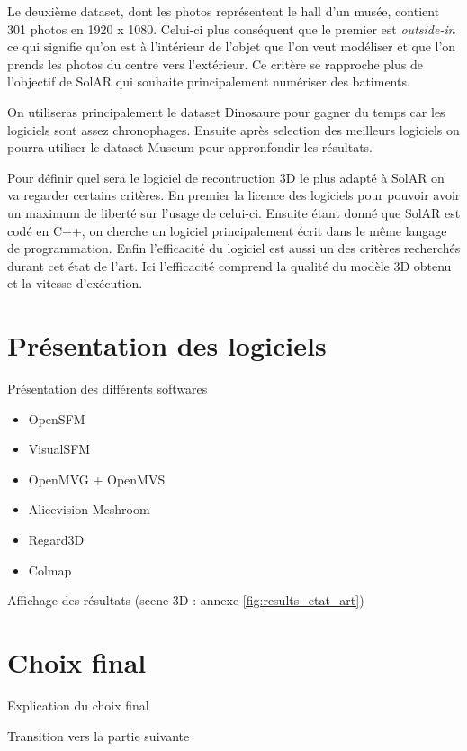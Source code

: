 Le deuxième dataset, dont les photos représentent le hall d'un musée, contient 301 photos en 1920 x 1080. Celui-ci plus conséquent que le premier est \emph{outside-in} ce qui signifie qu'on est à l'intérieur de l'objet que l'on veut modéliser et que l'on prends les photos du centre vers l'extérieur. Ce critère se rapproche plus de l'objectif de SolAR qui souhaite principalement numériser des batiments. 

On utiliseras principalement le dataset Dinosaure pour gagner du temps car les logiciels sont assez chronophages. Ensuite après selection des meilleurs logiciels on pourra utiliser le dataset Museum pour appronfondir les résultats.

Pour définir quel sera le logiciel de recontruction 3D le plus adapté à SolAR on va regarder certains critères. En premier la licence des logiciels pour pouvoir avoir un maximum de liberté sur l'usage de celui-ci. Ensuite étant donné que SolAR est codé en C++, on cherche un logiciel principalement écrit dans le même langage de programmation. Enfin l'efficacité du logiciel est aussi un des critères recherchés durant cet état de l'art. Ici l'efficacité comprend la qualité du modèle 3D obtenu et la vitesse d'exécution.

\section{Présentation des logiciels}

Présentation des différents softwares
\begin{itemize}
    \item OpenSFM
    \item VisualSFM
    \item OpenMVG + OpenMVS
    \item Alicevision Meshroom
    \item Regard3D
    \item Colmap
\end{itemize}

Affichage des résultats (scene 3D : annexe \ref{fig:results_etat_art})


\section{Choix final}

Explication du choix final

Transition vers la partie suivante